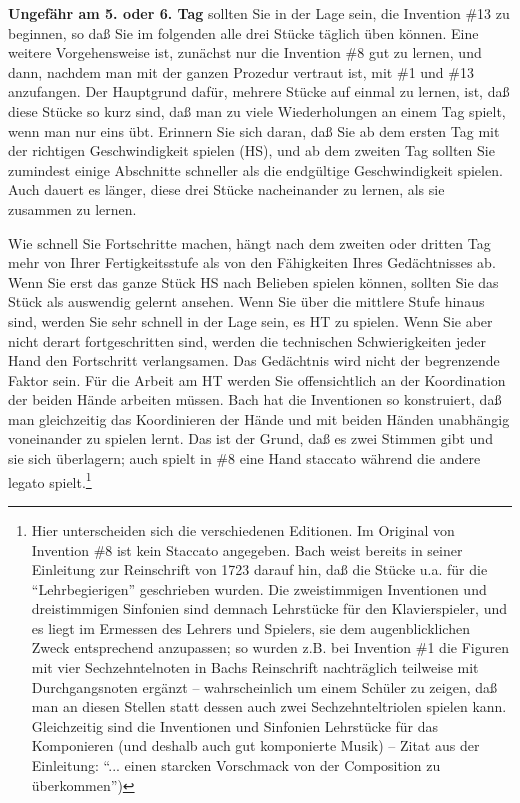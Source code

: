 \textbf{Ungefähr am 5. oder 6. Tag} sollten Sie in der Lage sein, die Invention \#13 zu beginnen, so daß Sie im folgenden alle drei Stücke täglich üben können.
Eine weitere Vorgehensweise ist, zunächst nur die Invention \#8 gut zu lernen, und dann, nachdem man mit der ganzen Prozedur vertraut ist, mit \#1 und \#13 anzufangen.
Der Hauptgrund dafür, mehrere Stücke auf einmal zu lernen, ist, daß diese Stücke so kurz sind, daß man zu viele Wiederholungen an einem Tag spielt, wenn man nur eins übt.
Erinnern Sie sich daran, daß Sie ab dem ersten Tag mit der richtigen Geschwindigkeit spielen (HS), und ab dem zweiten Tag sollten Sie zumindest einige Abschnitte schneller als die endgültige Geschwindigkeit spielen.
Auch dauert es länger, diese drei Stücke nacheinander zu lernen, als sie zusammen zu lernen.

Wie schnell Sie Fortschritte machen, hängt nach dem zweiten oder dritten Tag mehr von Ihrer Fertigkeitsstufe als von den Fähigkeiten Ihres Gedächtnisses ab.
Wenn Sie erst das ganze Stück HS nach Belieben spielen können, sollten Sie das Stück als auswendig gelernt ansehen.
Wenn Sie über die mittlere Stufe hinaus sind, werden Sie sehr schnell in der Lage sein, es HT zu spielen.
Wenn Sie aber nicht derart fortgeschritten sind, werden die technischen Schwierigkeiten jeder Hand den Fortschritt verlangsamen.
Das Gedächtnis wird nicht der begrenzende Faktor sein.
Für die Arbeit am HT werden Sie offensichtlich an der Koordination der beiden Hände arbeiten müssen.
Bach hat die Inventionen so konstruiert, daß man gleichzeitig das Koordinieren der Hände und mit beiden Händen unabhängig voneinander zu spielen lernt.
Das ist der Grund, daß es zwei Stimmen gibt und sie sich überlagern; auch spielt in \#8 eine Hand staccato während die andere legato spielt.\footnote{Hier unterscheiden sich die verschiedenen Editionen.
Im Original von Invention \#8 ist kein Staccato angegeben.
Bach weist bereits in seiner Einleitung zur Reinschrift von 1723 darauf hin, daß die Stücke u.a. für die \enquote{Lehrbegierigen} geschrieben wurden.
Die zweistimmigen Inventionen und dreistimmigen Sinfonien sind demnach Lehrstücke für den Klavierspieler, und es liegt im Ermessen des Lehrers und Spielers, sie dem augenblicklichen Zweck entsprechend anzupassen; so wurden z.B. bei Invention \#1 die Figuren mit vier Sechzehntelnoten in Bachs Reinschrift nachträglich teilweise mit Durchgangsnoten ergänzt -- wahrscheinlich um einem Schüler zu zeigen, daß man an diesen Stellen statt dessen auch zwei Sechzehnteltriolen spielen kann.
Gleichzeitig sind die Inventionen und Sinfonien Lehrstücke für das Komponieren (und deshalb auch gut komponierte Musik) -- Zitat aus der Einleitung: \enquote{... einen starcken Vorschmack von der Composition zu überkommen})}

